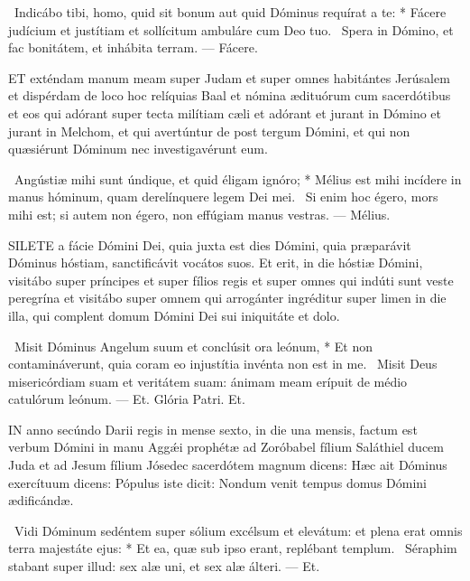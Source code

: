 \R\ Indicábo tibi, homo, quid sit bonum aut quid Dóminus requírat a te: * Fácere judícium et justítiam et sollícitum ambuláre cum Deo tuo. \V\ Spera in Dómino, et fac bonitátem, et inhábita terram. — Fácere.


\lettrine[lines=2]{E}{T} exténdam manum meam super Judam et super omnes habitántes Jerúsalem et dispérdam de loco hoc relíquias Baal et nómina ædituórum cum sacerdótibus et eos qui adórant super tecta milítiam cæli et adórant et jurant in Dómino et jurant in Melchom, et qui avertúntur de post tergum Dómini, et qui non quæsiérunt Dóminum nec investigavérunt eum.

\R\ Angústiæ mihi sunt úndique, et quid éligam ignóro; * Mélius est mihi incídere in manus hóminum, quam derelínquere legem Dei mei. \V\ Si enim hoc égero, mors mihi est; si autem non égero, non effúgiam manus vestras. — Mélius.



\lettrine[lines=2]{S}{ILETE} a fácie Dómini Dei, quia juxta est dies Dómini, quia præparávit Dóminus hóstiam, sanctificávit vocátos suos. Et erit, in die hóstiæ Dómini, visitábo super príncipes et super fílios regis et super omnes qui indúti sunt veste peregrína et visitábo super omnem qui arrogánter ingréditur super limen in die illa, qui complent domum Dómini Dei sui iniquitáte et dolo.

\R\ Misit Dóminus Angelum suum et conclúsit ora leónum, * Et non contamináverunt, quia coram eo injustítia invénta non est in me. \V\ Misit Deus misericórdiam suam et veritátem suam: ánimam meam erípuit de médio catulórum leónum. — Et. Glória Patri. Et.




\lettrine[lines=2]{I}{N} anno secúndo Darii regis in mense sexto, in die una mensis, factum est verbum Dómini in manu Aggǽi prophétæ ad Zoróbabel fílium Saláthiel ducem Juda et ad Jesum fílium Jósedec sacerdótem magnum dicens: Hæc ait Dóminus exercítuum dicens: Pópulus iste dicit: Nondum venit tempus domus Dómini ædificándæ.

\R\ Vidi Dóminum sedéntem super sólium excélsum et elevátum: et plena erat omnis terra majestáte ejus: * Et ea, quæ sub ipso erant, replébant templum. \V\ Séraphim stabant super illud: sex alæ uni, et sex alæ álteri. — Et.

